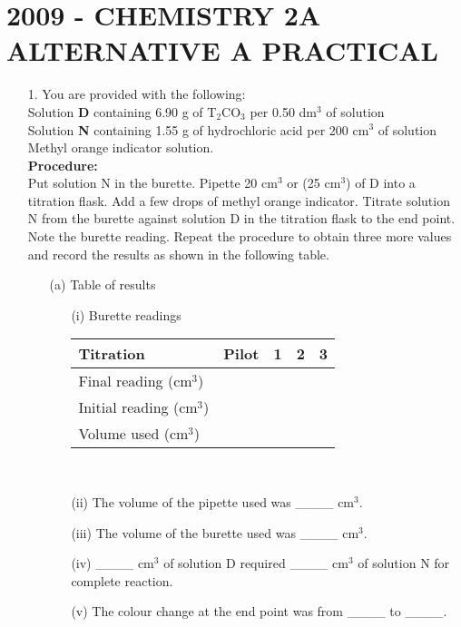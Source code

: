 \section{2009 - CHEMISTRY 2A ALTERNATIVE A PRACTICAL}

\begin{enumerate}

\item[1.] You are provided with the following:\\
Solution \textbf{D} containing 6.90 g of T$_2$CO$_3$ per 0.50 dm$^3$ of solution\\
Solution \textbf{N} containing 1.55 g of hydrochloric acid per 200 cm$^3$ of solution\\
Methyl orange indicator solution.\\

\textbf{Procedure:}\\
Put solution N in the burette. Pipette 20 cm$^3$ or (25 cm$^3$) of D into a titration flask. Add a few drops of methyl orange indicator. Titrate solution N from the burette against solution D in the titration flask to the end point. Note the burette reading. Repeat the procedure to obtain three more values and record the results as shown in the following table.\\

\begin{enumerate}
\item[(a)] Table of results\\
\begin{enumerate}
\item[(i)] Burette readings\\
\begin{center}
\begin{tabular}{|l|p{2cm}|p{2cm}|p{2cm}|p{2cm}|} \hline
\textbf{Titration}&\multicolumn{1}{|c|}{\textbf{Pilot}}&\multicolumn{1}{|c|}{\textbf{1}}&\multicolumn{1}{|c|}{\textbf{2}}&\multicolumn{1}{|c|}{\textbf{3}}\\ \hline
Final reading (cm$^3$)&&&&\\ \hline
Initial reading (cm$^3$)&&&&\\ \hline
Volume used (cm$^3$)&&&&\\ \hline
\end{tabular}\\
\end{center}
\item[(ii)] The volume of the pipette used was \_\_\_\_ cm$^3$.
\item[(iii)] The volume of the burette used was \_\_\_\_ cm$^3$.
\item[(iv)] \_\_\_\_ cm$^3$ of solution D required \_\_\_\_ cm$^3$ of solution N for complete reaction.\\
\item[(v)] The colour change at the end point was from \_\_\_\_ to \_\_\_\_.\\
\end{enumerate}


\end{enumerate}
\end{enumerate}
